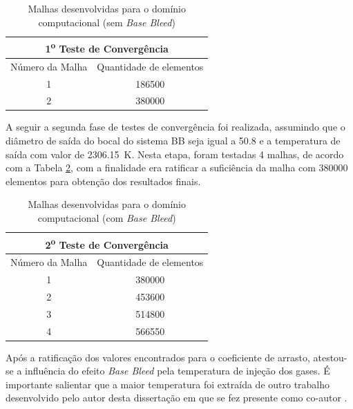 \begin{table}[ht]
\centering
\caption[Malhas desenvolvidas para o domínio computacional (sem \textit{Base Bleed})]{Malhas desenvolvidas para o domínio computacional (sem \textit{Base Bleed})}
\vspace{0.5cm}
\begin{tabular}{c|c}
\multicolumn{2}{c}{1\textsuperscript{o} Teste de Convergência} \\
\hline 
Número da Malha & Quantidade de elementos \\ 
\hline
1 & \num{186500} \\
2 & \num{380000}
\end{tabular}
\label{tab:tabela-malhas-inicial}
\end{table}

A seguir a segunda fase de testes de convergência foi realizada, assumindo que o diâmetro de saída do bocal do sistema BB seja igual a \qty{50,8}{\millimetre} e a temperatura de saída com valor de \qty{2306,15}{\kelvin}. Nesta etapa, foram testadas 4 malhas, de acordo com a Tabela \ref{tab:tabela-malhas-secundaria}, com a finalidade era ratificar a suficiência da malha com \num{380000} elementos para obtenção dos resultados finais.

\begin{table}[ht]
\centering
\caption[Malhas desenvolvidas para o domínio computacional (com \textit{Base Bleed})]{Malhas desenvolvidas para o domínio computacional (com \textit{Base Bleed})}
\vspace{0.5cm}
\begin{tabular}{c|c}
\multicolumn{2}{c}{2\textsuperscript{o} Teste de Convergência} \\
\hline 
Número da Malha & Quantidade de elementos \\ 
\hline
1 & \num{380000} \\
2 & \num{453600} \\
3 & \num{514800} \\
4 & \num{566550}
\end{tabular}
\label{tab:tabela-malhas-secundaria}
\end{table}

Após a ratificação dos valores encontrados para o coeficiente de arrasto, atestou-se a influência do efeito \textit{Base Bleed} pela temperatura de injeção dos gases. É importante salientar que a maior temperatura foi extraída de outro trabalho desenvolvido pelo autor desta dissertação em que se fez presente como co-autor \cite{Gil2020}.

